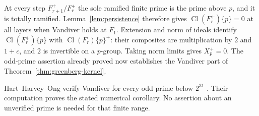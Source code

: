 \documentclass[11pt]{article}
\theoremstyle{definition}
\numberwithin{equation}{section}
\begin{document}
At every step $F_{r+1}^+/F_r^+$ the sole ramified finite prime is the
prime above $p$, and it is totally ramified. Lemma~\ref{lem:persistence}
therefore gives $\operatorname{Cl}(F_r^+)\{p\}=0$ at all layers when
Vandiver holds at $F_1$. Extension and norm of ideals identify
$\operatorname{Cl}(F_r^+)\{p\}$ with
$\operatorname{Cl}(F_r)\{p\}^+$: their composites are multiplication
by $2$ and $1+c$, and $2$ is invertible on a $p$-group. Taking norm
limits gives $X_p^+=0$. The odd-prime assertion already proved now
establishes the Vandiver part of Theorem~\ref{thm:greenberg-kernel}.

Hart--Harvey--Ong verify Vandiver for every odd prime below $2^{31}$
\cite[Section 1, item (2)]{HartHarveyOng2017}. Their computation
proves the stated numerical
corollary. No assertion about an unverified prime is needed for that
finite range.
\end{document}
